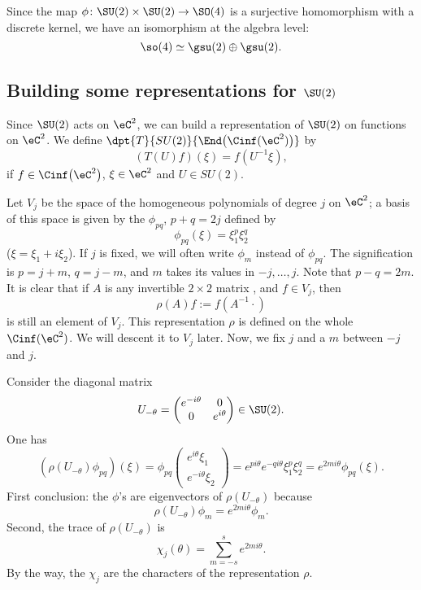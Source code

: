 Since the map $\phi\colon \SU(2)\times \SU(2)\to \SO(4)$ is a surjective homomorphism with a discrete kernel, we have an isomorphism at the algebra level:
\[
	\so(4)\simeq \gsu(2)\oplus\gsu(2).
\]

\subsection{Building some representations for \texorpdfstring{$\SU(2)$}{SU2}}

Since $\SU(2)$ acts on $\eC^2$, we can build a representation of $\SU(2)$ on functions on $\eC^2$. We define $\dpt{T}{SU(2)}{\End\big(\Cinf(\eC^2)\big)}$ by
\[
	(T(U)f)(\xi)=f(U^{-1}\xi),
\]
if $f\in\Cinf\big(\eC^2\big)$, $\xi\in\eC^2$ and $U\in SU(2)$.

Let $V_j$ be the space of the homogeneous polynomials of degree $j$ on $\eC^2$; a basis of this space is given by the $\phi_{pq}$, $p+q=2j$ defined by
\begin{equation}
	\phi_{pq}(\xi)=\xi_1^p\xi_2^q
\end{equation}
($\xi=\xi_1+i\xi_2$). If $j$ is fixed, we will often write $\phi_m$ instead of $\phi_{pq}$. The signification is $p=j+m$, $q=j-m$, and $m$ takes its values in $-j,\ldots,j$. Note that $p-q=2m$. It is clear that if $A$ is any invertible $2\times 2$ matrix , and $f\in V_j$, then
\[
	\rho(A)f:=f(A^{-1} \cdot)
\]
is still an element of $V_j$. This representation $\rho$ is defined on the whole $\Cinf(\eC^2)$. We will descent it to $V_j$ later.
Now, we fix $j$ and a $m$ between $-j$ and $j$.

Consider the diagonal matrix
\[   U_{-\theta}=\begin{pmatrix}
		e^{-i\theta} & 0           \\
		0            & e^{i\theta}
	\end{pmatrix} \in\SU(2).
\]
One has
\begin{equation}
	\left(\rho(U_{-\theta})\phi_{pq}\right)(\xi)=\phi_{pq}
	\begin{pmatrix}
		e^{i\theta}\xi_1 \\
		e^{-i\theta}\xi_2
	\end{pmatrix}
	= e^{pi\theta} e^{-qi\theta}\xi_1^p\xi_2^q
	=e^{2mi\theta}\phi_{pq}(\xi).
\end{equation}
First conclusion: the $\phi$'s are eigenvectors of $\rho(U_{-\theta})$ because
\[
	\rho(U_{-\theta})\phi_m=e^{2mi\theta}\phi_m.
\]
Second, the trace of $\rho(U_{-\theta})$ is
\begin{equation}
	\chi_j(\theta)=\sum_{m=-s}^{s}e^{2mi\theta}.
\end{equation}
By the way, the $\chi_j$ are the characters of the representation $\rho$.

